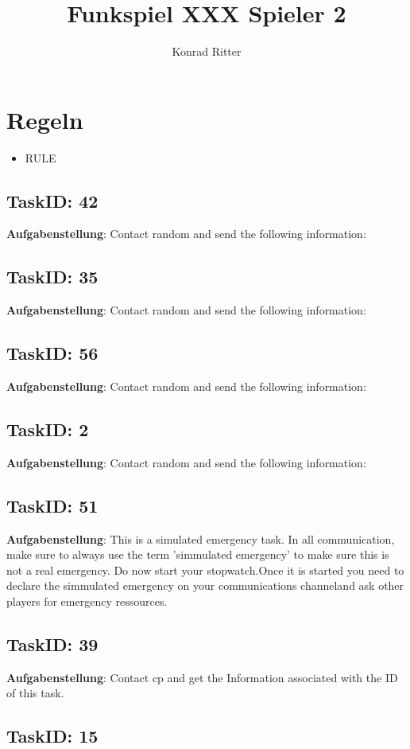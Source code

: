 \documentclass[12pt,a4paper]{scrreprt}
\author{Konrad Ritter}
\title{Funkspiel XXX Spieler 2}
\begin{document}
\maketitle
\section{Regeln}
\begin{itemize}
	\item RULE
\end{itemize}

\subsection{TaskID: 42}
\textbf{Aufgabenstellung}: Contact random and send the following information: \subsection{TaskID: 35}
\textbf{Aufgabenstellung}: Contact random and send the following information: \subsection{TaskID: 56}
\textbf{Aufgabenstellung}: Contact random and send the following information: \subsection{TaskID: 2}
\textbf{Aufgabenstellung}: Contact random and send the following information: \subsection{TaskID: 51}
\textbf{Aufgabenstellung}: This is a simulated emergency task. In all communication, make sure to always use the term 'simmulated emergency' to make sure this is not a real emergency. Do now start your stopwatch.Once it is started you need to declare the simmulated emergency on your communications channeland ask other players for emergency ressources.\subsection{TaskID: 39}
\textbf{Aufgabenstellung}: Contact {cp} and get the Information associated with the ID of this task.\subsection{TaskID: 15}
\end{document}

